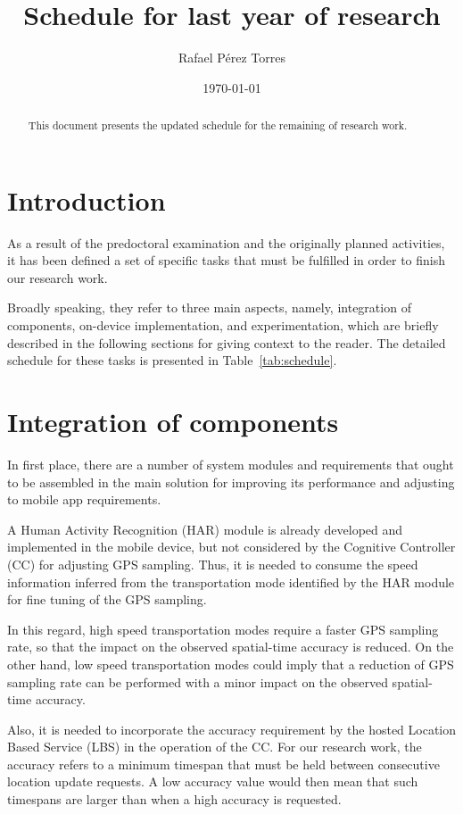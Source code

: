 \documentclass[10pt]{article}
\title{Schedule for last year of research}
\author{Rafael Pérez Torres}
\date{\today}
\begin{document}
\maketitle
\begin{abstract}
This document presents the updated schedule for the remaining of research work.
\end{abstract}

\section{Introduction}
As a result of the predoctoral examination and the originally planned activities, it has been defined a set of specific tasks that must be fulfilled in order to finish our research work.

Broadly speaking, they refer to three main aspects, namely, integration of components, on-device implementation, and experimentation, which are briefly described in the following sections for giving context to the reader.
The detailed schedule for these tasks is presented in Table~\ref{tab:schedule}.

\section{Integration of components}
In first place, there are a number of system modules and requirements that ought to be assembled in the main solution for improving its performance and adjusting to mobile app requirements.

A Human Activity Recognition (HAR) module is already developed and implemented in the mobile device, but not considered by the Cognitive Controller (CC) for adjusting GPS sampling.
Thus, it is needed to consume the speed information inferred from the transportation mode identified by the HAR module for fine tuning of the GPS sampling.

In this regard, high speed transportation modes require a faster GPS sampling rate, so that the impact on the observed spatial-time accuracy is reduced.
On the other hand, low speed transportation modes could imply that a reduction of GPS sampling rate can be performed with a minor impact on the observed spatial-time accuracy.

Also, it is needed to incorporate the accuracy requirement by the hosted Location Based Service (LBS) in the operation of the CC.
For our research work, the accuracy refers to a minimum timespan that must be held between consecutive location update requests.
A low accuracy value would then mean that such timespans are larger than when a high accuracy is requested.
\end{document}
